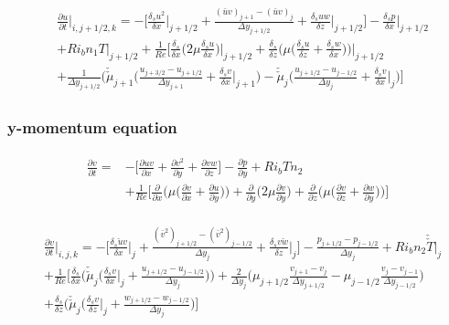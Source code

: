 \documentclass[preprint,12pt]{article}
\begin{document}
\begin{align}	\begin{split}
&\frac{\partial u}{\partial t}\Bigg|_{i,j+1/2,k}=-\Bigg[\frac{\delta_s u^2}{\delta x}\Bigg|_{j+1/2}+\frac{(\bar{u}v)_{j+1}-(\bar{u}v)_{j}}{\Delta y_{j+1/2}}+\frac{\delta_s uw}{\delta z}\Bigg|_{j+1/2}\Bigg]-\frac{\delta_s p}{\delta x}\Bigg|_{j+1/2}\\&+Ri_bn_1T|_{j+1/2} +\frac{1}{Re}\Bigg[\frac{\delta_s }{\delta x}\Big(2\mu\frac{\delta_s u}{\delta x}\Big)\Bigg|_{j+1/2}+\frac{\delta_s }{\delta z}\Bigg(\mu\Big(\frac{\delta_s u}{\delta z}+\frac{\delta_s w}{\delta x}\Big)\Bigg)\Bigg|_{j+1/2}\\&+\frac{1}{\Delta y_{j+1/2}}\Bigg(\check{\check{\mu}}_{j+1}\Bigg(\frac{u_{j+3/2}-u_{j+1/2}}{\Delta y_{j+1}}+\frac{\delta_s v}{\delta x}\Bigg|_{j+1}\Bigg)-\check{\check{\mu}}_{j}\Bigg(\frac{u_{j+1/2}-u_{j-1/2}}{\Delta y_{j}}+\frac{\delta_s v}{\delta x}\Bigg|_{j}\Bigg)\Bigg] 
\end{split}	\end{align} 

\subsubsection{y-momentum equation}
\begin{align}	\begin{split}
\frac{\partial v}{\partial t}=&-\Bigg[\frac{\partial uv}{\partial x}+\frac{\partial v^2}{\partial y}+\frac{\partial vw}{\partial z}\Bigg]-\frac{\partial p}{\partial y}+Ri_bT n_2\\&+\frac{1}{Re}\Bigg[\frac{\partial }{\partial x}\Big(\mu\Big(\frac{\partial v}{\partial x}+\frac{\partial u}{\partial y}\Big)\Big)+\frac{\partial }{\partial y}\Bigg(2\mu\frac{\partial v}{\partial y}\Bigg)+\frac{\partial }{\partial z}\Bigg(\mu\Big(\frac{\partial v}{\partial z}+\frac{\partial w}{\partial y}\Big)\Bigg)\Bigg]
\end{split}	\end{align}

\begin{align}	\begin{split}
&\frac{\partial v}{\partial t}\Bigg|_{i,j,k}=-\Bigg[\frac{\delta_s \check{u}v}{\delta x}\Bigg|_{j}+\frac{(\bar{v}^2)_{j+1/2}-(\bar{v}^2)_{j-1/2}}{\Delta y_{j}}+\frac{\delta_s v\check{w}}{\delta z}\Bigg|_{j}\Bigg]-\frac{p_{j+1/2}-p_{j-1/2}}{\Delta y_j}+Ri_bn_2\check{\check{T}}|_{j} \\&+\frac{1}{Re}\Bigg[\frac{\delta_s}{\delta x}\Big(\check{\check{\mu}}_j\Big(\frac{\delta_s v}{\delta x}\Big|_j+\frac{u_{j+1/2}-u_{j-1/2}}{\Delta y_j}\Big)\Big)+\frac{2}{\Delta y_j}\Big(\mu_{j+1/2}\frac{v_{j+1}-v_j}{\Delta y_{j+1/2}}-\mu_{j-1/2}\frac{v_{j}-v_{j-1}}{\Delta y_{j-1/2}} \Big)\\&+\frac{\delta_s }{\delta z}\Big(\check{\check{\mu}}_j\Big(\frac{\delta_s v}{\delta z}\Big|_j+\frac{w_{j+1/2}-w_{j-1/2}}{\Delta y_j}\Big)\Bigg] 
\end{split}	\end{align} 
\end{document}
